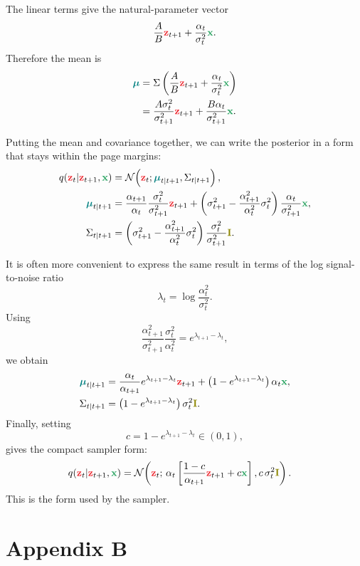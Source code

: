 \documentclass[usenames,dvipsnames]{article}
\newcommand{\myvec}[1]{\mathbf{#1}}
\newcommand{\myvecsym}[1]{\boldsymbol{#1}}
\newcommand{\vx}{\myvec{\textcolor{ForestGreen}{x}}}
\newcommand{\vz}{\myvec{\textcolor{Red}{z}}}
\newcommand{\vI}{\myvec{\textcolor{olive}{I}}}
\newcommand{\vmu}{\myvecsym{\textcolor{teal}{\mu}}}
\newcommand{\gauss}{\mathcal{N}}
\begin{document}
The linear terms give the natural-parameter vector
\[
    \frac{A}{B}\vz_{t+1}
    +
    \frac{\alpha_t}{\sigma_t^2}\vx .
\]
Therefore the mean is
\begin{align}
\vmu
&=
\Sigma
\left(
    \frac{A}{B}\vz_{t+1}
    +
    \frac{\alpha_t}{\sigma_t^2}\vx
\right)
\nonumber \\
&=
\frac{A\sigma_t^2}{\sigma_{t+1}^2}\vz_{t+1}
+
\frac{B\alpha_t}{\sigma_{t+1}^2}\vx .
\end{align}

Putting the mean and covariance together, we can write the posterior in a form that stays within the page margins:
\begin{align}
q(\vz_t|\vz_{t+1},\vx)
&=
\gauss\!\left(
    \vz_t;
    \vmu_{t|t+1},
    \Sigma_{t|t+1}
\right),
\\
\vmu_{t|t+1}
&=
\frac{\alpha_{t+1}}{\alpha_t}
\frac{\sigma_t^2}{\sigma_{t+1}^2}
\vz_{t+1}
+
\left(
    \sigma_{t+1}^2
    -
    \frac{\alpha_{t+1}^2}{\alpha_t^2}\sigma_t^2
\right)
\frac{\alpha_t}{\sigma_{t+1}^2}\vx,
\\
\Sigma_{t|t+1}
&=
\left(
    \sigma_{t+1}^2
    -
    \frac{\alpha_{t+1}^2}{\alpha_t^2}\sigma_t^2
\right)
\frac{\sigma_t^2}{\sigma_{t+1}^2}\vI .
\end{align}

It is often more convenient to express the same result in terms of the log signal-to-noise ratio
\[
    \lambda_t = \log\frac{\alpha_t^2}{\sigma_t^2}.
\]
Using
\[
    \frac{\alpha_{t+1}^2}{\sigma_{t+1}^2}
    \frac{\sigma_t^2}{\alpha_t^2}
    =
    e^{\lambda_{t+1}-\lambda_t},
\]
we obtain
\begin{align}
\vmu_{t|t+1}
&=
\frac{\alpha_t}{\alpha_{t+1}}
e^{\lambda_{t+1}-\lambda_t}
\vz_{t+1}
+
\left(
    1-e^{\lambda_{t+1}-\lambda_t}
\right)
\alpha_t\vx,
\\
\Sigma_{t|t+1}
&=
\left(
    1-e^{\lambda_{t+1}-\lambda_t}
\right)
\sigma_t^2\vI .
\end{align}
Finally, setting
\[
    c = 1-e^{\lambda_{t+1}-\lambda_t}\in(0,1),
\]
gives the compact sampler form:
\begin{align}
q(\vz_t|\vz_{t+1},\vx)
&=
\gauss\!\left(
    \vz_t;\,
    \alpha_t\left[
        \frac{1-c}{\alpha_{t+1}}\vz_{t+1}
        +
        c\vx
    \right],
    c\,\sigma_t^2\vI
\right).
\end{align}
This is the form used by the sampler.






\newpage
\section*{Appendix B}
\end{document}
